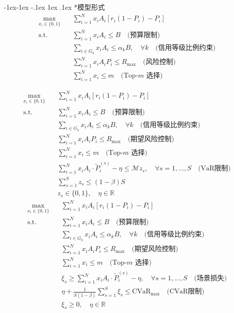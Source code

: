 \documentclass[12pt,nonblindrev]{write_paper}
\makeatletter
\renewcommand\subsection{\@startsection{subsection}{2}{\z@}%
                                     {-1ex\@plus -1ex \@minus -.1ex}%
                                     {1ex \@plus .1ex}%
                                     {\normalfont \normalsize \bfseries}}
\makeatother
\begin{document}
\subsection*{模型形式}
\begin{equation}
\begin{aligned}
\max_{x_i \in \{0,1\}} \quad & \sum_{i=1}^N x_i A_i \left[ r_i(1 - P_i) - P_i \right] \\
\text{s.t.} \quad
& \sum_{i=1}^N x_i A_i \le B \quad \text{(预算限制)} \\
& \sum_{i \in G_k} x_i A_i \le \alpha_k B, \quad \forall k \quad \text{(信用等级比例约束)} \\
& \sum_{i=1}^N x_i A_i P_i \le R_{\max} \quad \text{(风险控制)} \\
& \sum_{i=1}^N x_i \le m \quad \text{(Top-$m$ 选择)}
\end{aligned}
\label{eq:main_model} 
\end{equation}


\begin{equation}
\begin{aligned}
\max_{x_i \in \{0,1\}} \quad & \sum_{i=1}^N x_i A_i \left[ r_i(1 - P_i) - P_i \right] \\
\text{s.t.} \quad
& \sum_{i=1}^N x_i A_i \le B \quad \text{(预算限制)} \\
& \sum_{i \in G_k} x_i A_i \le \alpha_k B, \quad \forall k \quad \text{(信用等级比例约束)} \\
& \sum_{i=1}^N x_i A_i P_i \le R_{\max} \quad \text{(期望风险控制)} \\
& \sum_{i=1}^N x_i \le m \quad \text{(Top-$m$ 选择)} \\
& \sum_{i=1}^N x_i A_i \cdot \tilde{P}_i^{(s)} - \eta \le \mathcal{M} z_s, \quad \forall s=1,\dots,S \quad \text{(VaR限制)} \\
& \sum_{s=1}^S z_s \le (1 - \beta) S \\
& z_s \in \{0,1\}, \quad \eta \in \mathbb{R}
\end{aligned}
\label{eq:var_model}
\end{equation}
\begin{equation}
\begin{aligned}
\max_{x_i \in \{0,1\}} \quad & \sum_{i=1}^N x_i A_i \left[ r_i(1 - P_i) - P_i \right] \\
\text{s.t.} \quad
& \sum_{i=1}^N x_i A_i \le B \quad \text{(预算限制)} \\
& \sum_{i \in G_k} x_i A_i \le \alpha_k B, \quad \forall k \quad \text{(信用等级比例约束)} \\
& \sum_{i=1}^N x_i A_i P_i \le R_{\max} \quad \text{(期望风险控制)} \\
& \sum_{i=1}^N x_i \le m \quad \text{(Top-$m$ 选择)} \\
& \xi_s \ge \sum_{i=1}^N x_i A_i \cdot \tilde{P}_i^{(s)} - \eta, \quad \forall s = 1,\dots,S \quad \text{(场景损失)} \\
& \eta + \frac{1}{S(1 - \beta)} \sum_{s=1}^S \xi_s \le \text{CVaR}_{\max} \quad \text{(CVaR限制)} \\
& \xi_s \ge 0, \quad \eta \in \mathbb{R}
\end{aligned}
\label{eq:cvar_model}
\end{equation}
\end{document}
